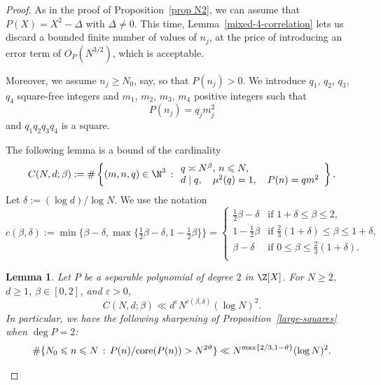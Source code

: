 \documentclass[reqno, 12pt]{amsart}
\theoremstyle{plain}
\newtheorem{lemma}[theorem]{Lemma}
\theoremstyle{definition}
\theoremstyle{remark}
\renewcommand{\le}{\leqslant}
\renewcommand{\ge}{\geqslant}
\renewcommand{\leq}{\leqslant}
\renewcommand{\geq}{\geqslant}
\begin{document}
\begin{proof}
As in the proof of Proposition~\ref{prop N2}, we can assume that $P(X)=X^2-\Delta$ with $\Delta\neq 0.$
This time, Lemma~\ref{mixed-4-correlation} lets us discard a bounded finite number of values of $n_j$, at the price of introducing an error term of $O_P(N^{3/2})$,
which is acceptable.

Moreover, we assume $n_j\ge N_0$, say, so that $P(n_j)>0$.
We introduce $q_1$, $q_2$, $q_3$, $q_4$ square-free integers and $m_1$, $m_2$, $m_3$, $m_4$ positive integers such that
$$P(n_j)=q_jm_j^2$$
and $q_1q_2q_3q_4$ is a square.


The following  lemma is a bound of the cardinality
\begin{equation}
    \label{eq CBbeta}C(N,d;\beta):=\# \left\{ (m,n,q)\in \N^3\,:\begin{array}{l}  q\asymp N^{\beta},\, n\leq N,\cr d\mid q,\quad \mu^2(q)=1,\quad P(n)=qm^2\end{array}\right\} .\end{equation}
    Let  $\delta :=(\log d)/\log N$.
We use the notation $$c(\beta,\delta):=\min\big\{ \beta-\delta, \max\{ \tfrac 12\beta-\delta,1- \tfrac 12\beta\}\big\}
=\begin{cases}
    \tfrac 12\beta-\delta & \text{if $1+\delta\leq \beta\leq 2,$}\\
     1-\tfrac 12\beta & \text{if $\tfrac23(1+\delta)\leq \beta\leq 1+\delta,$}\\
      \beta-\delta & \text{if $0\leq \beta\leq \tfrac 23(1+\delta).$}\\
\end{cases}$$


\begin{lemma}\label{lemma majCNdbeta}Let $P$ be a separable polynomial of degree $2$ in $\Z[X]$.  
    For $N\geq 2$, $d\ge 1$, $\beta\in [0,2]$, and $\varepsilon>0$,
    \begin{equation}
    \label{bound CBbeta}C(N,d;\beta) \ll d^\varepsilon N^{c(\beta,\delta)} (\log N)^2 .\end{equation}
    In particular, we have the following sharpening of
    Proposition~\ref{large-squares} when $\deg{P}=2$:
    \begin{equation}
        \label{large square deg=2}
    \#\{ N_0\le n\leq N \,:\, P(n)/\textnormal{core}(P(n))>N^{2\vartheta}\}\ll N^{\max\{ 2/3,1-\vartheta\}}(\log N)^2.\end{equation}
\end{lemma}




\end{proof}
\end{document}

